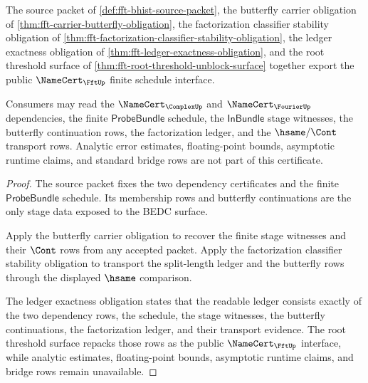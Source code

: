 \begin{theorem}
\label{thm:fft-schedule-public-namecert-export}
The source packet of \autoref{def:fft-bhist-source-packet}, the butterfly
carrier obligation of \autoref{thm:fft-carrier-butterfly-obligation}, the
factorization classifier stability obligation of
\autoref{thm:fft-factorization-classifier-stability-obligation}, the ledger
exactness obligation of \autoref{thm:fft-ledger-exactness-obligation}, and the
root threshold surface of \autoref{thm:fft-root-threshold-unblock-surface}
together export the public $\NameCert_{\FftUp}$ finite schedule interface.

Consumers may read the $\NameCert_{\ComplexUp}$ and
$\NameCert_{\FourierUp}$ dependencies, the finite $\mathsf{ProbeBundle}$
schedule, the $\mathsf{InBundle}$ stage witnesses, the butterfly continuation
rows, the factorization ledger, and the $\hsame/\Cont$ transport rows. Analytic
error estimates, floating-point bounds, asymptotic runtime claims, and standard
bridge rows are not part of this certificate.
\end{theorem}
\begin{proof}
The source packet fixes the two dependency certificates and the finite
$\mathsf{ProbeBundle}$ schedule. Its membership rows and butterfly
continuations are the only stage data exposed to the BEDC surface.

Apply the butterfly carrier obligation to recover the finite stage witnesses
and their $\Cont$ rows from any accepted packet. Apply the factorization
classifier stability obligation to transport the split-length ledger and the
butterfly rows through the displayed $\hsame$ comparison.

The ledger exactness obligation states that the readable ledger consists
exactly of the two dependency rows, the schedule, the stage witnesses, the
butterfly continuations, the factorization ledger, and their transport
evidence. The root threshold surface repacks those rows as the public
$\NameCert_{\FftUp}$ interface, while analytic estimates, floating-point
bounds, asymptotic runtime claims, and bridge rows remain unavailable.
\end{proof}

